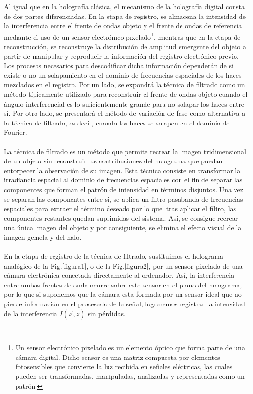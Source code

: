 \documentclass[12pt]{article}
\begin{document}
Al igual que en la holografía clásica, el mecanismo de la holografía digital consta  de dos partes diferenciadas. En la etapa de registro, se almacena  la intensidad de la interferencia entre el frente de ondas objeto y el frente de ondas de referencia mediante el uso de un sensor electrónico pixelado\footnote{Un sensor electrónico pixelado es un elemento óptico que forma parte de una cámara digital. Dicho sensor es una matriz compuesta por elementos fotosensibles que convierte la luz recibida en señales eléctricas, las cuales pueden ser transformadas, manipuladas, analizadas y representadas como un patrón.}, mientras que en la etapa de reconstrucción, se reconstruye  la distribución de amplitud emergente del objeto a partir de manipular y reproducir la información del registro electrónico previo.  Los procesos necesarios para descodificar dicha información dependerán de si existe o no un solapamiento en el dominio de frecuencias espaciales de los haces mezclados en el registro.  Por un lado, se expondrá la técnica de filtrado  \cite{10} como un método típicamente utilizado  para reconstruir el frente de ondas objeto cuando el  ángulo interferencial es lo suficientemente grande para no solapar los haces entre sí. Por otro lado, se presentará el método de variación de fase \cite{11} como  alternativa a la técnica de filtrado, es decir, cuando los haces se solapen en el dominio de Fourier.\\\\
La técnica de filtrado es un método que permite   recrear la imagen tridimensional de un objeto sin reconstruir las contribuciones del holograma que puedan entorpecer la observación de su imagen. Esta técnica consiste en transformar la irradiancia espacial al dominio de frecuencias espaciales con el fin de separar las componentes que forman el patrón de intensidad en términos disjuntos. Una vez se separan las componentes entre sí, se aplica un filtro pasabanda de frecuencias espaciales para extraer el término deseado por lo que, tras aplicar el filtro, las componentes restantes quedan suprimidas del sistema. Así, se  consigue  recrear  una única imagen del objeto y por consiguiente, se elimina el efecto visual de la imagen gemela y del halo.\\ \\
En la etapa de registro  de la técnica de filtrado, sustituimos el holograma analógico de la Fig.\ref{figura1}, o  de la Fig.\ref{figura2},  por un sensor pixelado de una cámara electrónica conectada directamente al ordenador. Así, la interferencia entre ambos frentes de onda ocurre sobre este sensor  en el plano del holograma,  por lo que si suponemos que la cámara esta formada por un sensor ideal que no pierde información en el procesado de la señal, lograremos registrar la intensidad de la interferencia $I(\Vec{x},z)$ sin pérdidas. \\ \\
\end{document}
